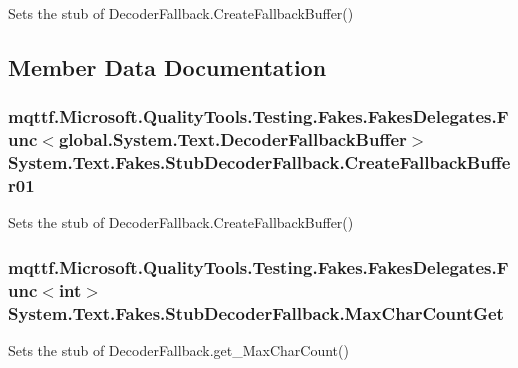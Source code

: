 Sets the stub of Decoder\-Fallback.\-Create\-Fallback\-Buffer()



\subsection{Member Data Documentation}
\hypertarget{class_system_1_1_text_1_1_fakes_1_1_stub_decoder_fallback_a6cba5d9313a6014ab195efdad14b6c36}{
\subsubsection[{Create\-Fallback\-Buffer01}]{\setlength{\rightskip}{0pt plus 5cm}mqttf.\-Microsoft.\-Quality\-Tools.\-Testing.\-Fakes.\-Fakes\-Delegates.\-Func$<$global.\-System.\-Text.\-Decoder\-Fallback\-Buffer$>$ System.\-Text.\-Fakes.\-Stub\-Decoder\-Fallback.\-Create\-Fallback\-Buffer01}}\label{class_system_1_1_text_1_1_fakes_1_1_stub_decoder_fallback_a6cba5d9313a6014ab195efdad14b6c36}


Sets the stub of Decoder\-Fallback.\-Create\-Fallback\-Buffer()

\hypertarget{class_system_1_1_text_1_1_fakes_1_1_stub_decoder_fallback_a8115bd5d92356ca66a07b7d906189111}{
\subsubsection[{Max\-Char\-Count\-Get}]{\setlength{\rightskip}{0pt plus 5cm}mqttf.\-Microsoft.\-Quality\-Tools.\-Testing.\-Fakes.\-Fakes\-Delegates.\-Func$<$int$>$ System.\-Text.\-Fakes.\-Stub\-Decoder\-Fallback.\-Max\-Char\-Count\-Get}}\label{class_system_1_1_text_1_1_fakes_1_1_stub_decoder_fallback_a8115bd5d92356ca66a07b7d906189111}


Sets the stub of Decoder\-Fallback.\-get\-\_\-\-Max\-Char\-Count()



